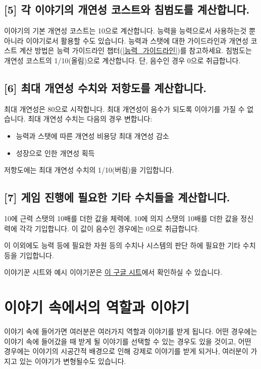 \documentclass[12pt]{report}
\newcommand{\world}[1]{{\nanumpen \large #1 \par}\bigskip}
\begin{document}
	\section*{[5] 각 이야기의 개연성 코스트와 침범도를 계산합니다.}
	
	이야기의 기본 개연성 코스트는 10으로 계산합니다.
	능력을 능력으로서 사용하는것 뿐 아니라 이야기로서 활용할 수도 있습니다.
	능력과 스탯에 대한 가이드라인과 개연성 코스트 계산 방법은 능력 가이드라인 챕터(\ref{능력_가이드라인})를 참고하세요. 침범도는 개연성 코스트의 1/10(올림)으로 계산합니다. 단, 음수인 경우 0으로 취급합니다.
	
	\section*{[6] 최대 개연성 수치와 저항도를 계산합니다.}
	최대 개연성은 80으로 시작합니다. 최대 개연성이 음수가 되도록 이야기를 가질 수 없습니다.
	최대 개연성 수치는 다음의 경우 변합니다:
	\begin{itemize}
		\item 능력과 스탯에 따른 개연성 비용당 최대 개연성 감소
		\item 성장으로 인한 개연성 획득
	\end{itemize}
	저항도에는 최대 개연성 수치의 1/10(버림)을 기입합니다.
	
	\section*{[7] 게임 진행에 필요한 기타 수치들을 계산합니다.}
	10에 근력 스탯의 10배를 더한 값을 체력에, 10에 의지 스탯의 10배를 더한 값을 정신력에 각각 기입합니다. 이 값이 음수인 경우에는 0으로 취급합니다.
	
	이 이외에도 능력 등에 필요한 자원 등의 수치나 시스템의 판단 하에 필요한 기타 수치 등을 기입합니다.

	\bigskip

	이야기꾼 시트와 예시 이야기꾼은 \href{https://docs.google.com/spreadsheets/d/1g3ZO-oALMVbytbE2tvSBdT6czxB32XHZ1crWIGavEhQ/edit?usp=sharing}{이 구글 시트}에서 확인하실 수 있습니다.
	
	\chapter{이야기 속에서의 역할과 이야기}
	\world{이야기 속에 들어가면 여러분은 여러가지 역할과 이야기를 받게 됩니다. 어떤 경우에는 이야기 속에 들어갔을 때 받게 될 이야기를 선택할 수 있는 경우도 있을 것이고, 어떤 경우에는 이야기의 시공간적 배경으로 인해 강제로 이야기를 받게 되거나, 여러분이 가지고 있는 이야기가 변형될수도 있습니다.}
	
\end{document}
